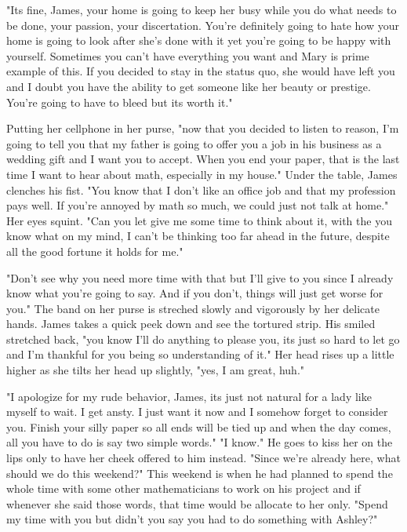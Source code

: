         "Its fine, James, your home is going to keep her busy while you do what needs to be done, your passion, your discertation. You're 
    definitely going to hate how your home is going to look after she's done with it yet you're going to be happy with yourself. Sometimes you
    can't have everything you want and Mary is prime example of this. If you decided to stay in the status quo, she would have left you and
    I doubt you have the ability to get someone like her beauty or prestige. You're going to have to bleed but its worth it."

       Putting her cellphone in her purse, "now that you decided to listen to reason, I'm going to tell you that my father is going to offer you
    a job in his business as a wedding gift and I want you to accept. When you end your paper, that is the last time I want to hear about math,
    especially in my house." Under the table, James clenches his fist. "You know that I don't like an office job and that my profession pays well.
    If you're annoyed by math so much, we could just not talk at home." Her eyes squint. "Can you let give me some time to think about it, with
    the you know what on my mind, I can't be thinking too far ahead in the future, despite all the good fortune it holds for me."

        "Don't see why you need more time with that but I'll give to you since I already know what you're going to say. And if you don't, things
    will just get worse for you." The band on her purse is streched slowly and vigorously by her delicate hands. James takes a quick peek down
    and see the tortured strip. His smiled stretched back, "you know I'll do anything to please you, its just so hard to let go and I'm thankful
    for you being so understanding of it." Her head rises up a little higher as she tilts her head up slightly, "yes, I am great, huh."

        "I apologize for my rude behavior, James, its just not natural for a lady like myself to wait. I get ansty. I just want it now and I 
    somehow forget to consider you. Finish your silly paper so all ends will be tied up and when the day comes, all you have to do is say two
    simple words." "I know." He goes to kiss her on the lips only to have her cheek offered to him instead. "Since we're already here, what should
    we do this weekend?" This weekend is when he had planned to spend the whole time with some other mathematicians to work on his 
    project and if whenever she said those words, that time would be allocate to her only. "Spend my time with you but didn't you say you had to
    do something with Ashley?"

